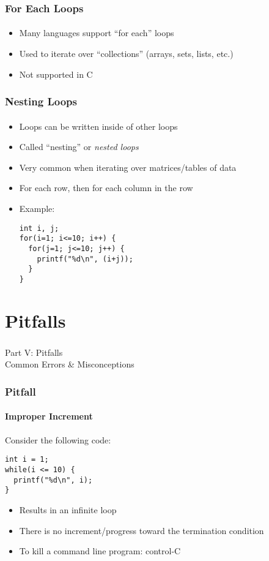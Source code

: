 \documentclass[]{beamer}
\begin{document}
\begin{frame}[fragile]
  \frametitle{For Each Loops}
  \framesubtitle{}


\begin{itemize}[<+->]
  \item Many languages support ``for each'' loops
  \item Used to iterate over ``collections'' (arrays, sets, lists, etc.)
  \item Not supported in C
\end{itemize}
  
  
\end{frame}

\begin{frame}[fragile]
  \frametitle{Nesting Loops}
  \framesubtitle{}

\begin{itemize}[<+->]
  \item Loops can be written inside of other loops
  \item Called ``nesting'' or \emph{nested loops}
  \item Very common when iterating over matrices/tables of data 
  \item For each row, then for each column in the row
  \item Example:
\begin{verbatim}
int i, j;
for(i=1; i<=10; i++) {
  for(j=1; j<=10; j++) {
    printf("%d\n", (i+j));
  }
}
\end{verbatim}
\end{itemize}

\end{frame}
 
\section{Pitfalls}

\begin{frame}
    \frametitle{}
    \framesubtitle{}
    
    \begin{center}
    {\Huge Part V: Pitfalls}\\
    {\Large Common Errors \& Misconceptions}
    \end{center}

\end{frame}


\begin{frame}[fragile]
  \frametitle{Pitfall}
  \framesubtitle{Improper Increment}

Consider the following code:
\begin{verbatim}
int i = 1;
while(i <= 10) {
  printf("%d\n", i);
}
\end{verbatim}

\begin{itemize}[<+(1)->]
  \item Results in an infinite loop
  \item There is no increment/progress toward the termination condition 
  \item To kill a command line program: control-C
\end{itemize}

\end{frame}
\end{document}
